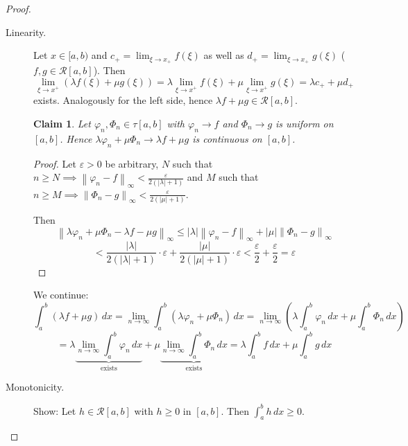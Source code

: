 \documentclass{article}
\newtheorem*{claim}{Claim}%
\newcommand{\norm}[1]{\left\|#1\right\|}
\newcommand{\card}[1]{\left|#1\right|}
\begin{document}
\begin{proof}\hfill{}
  \begin{description}
    \item[Linearity.] 
      Let $x \in [a,b)$ and $c_+ = \lim_{\xi \to x_+} f(\xi)$ as well as $d_+ = \lim_{\xi \to x_+} g(\xi)$
      ($f,g \in \mathcal R[a,b]$). Then
      \[
        \lim_{\xi \to x^+} (\lambda f(\xi) + \mu g(\xi))
          = \lambda \lim_{\xi \to x^+} f(\xi) + \mu \lim_{\xi \to x^+} g(\xi)
          = \lambda c_+ + \mu d_+
      \]
      exists. Analogously for the left side, hence $\lambda f + \mu g \in \mathcal R[a,b]$.

      \begin{claim}
        Let $\varphi_n, \Phi_n \in \tau[a,b]$ with $\varphi_n \to f$ and $\Phi_n \to g$ is uniform on $[a,b]$.
        Hence $\lambda \varphi_n + \mu \Phi_n \to \lambda f + \mu g$ is continuous on $[a,b]$.
      \end{claim}

      \begin{proof}
        Let $\varepsilon > 0$ be arbitrary,
        $N$ such that $n \geq N \implies \norm{\varphi_n - f}_{\infty} < \frac{\varepsilon}{2(\card{\lambda} + 1)}$
        and $M$ such that $n \geq M \implies \norm{\Phi_n - g}_{\infty} < \frac{\varepsilon}{2(\card{\mu} + 1)}$.

        Then
        \[
          \norm{\lambda \varphi_n + \mu \Phi_n - \lambda f - \mu g}_{\infty}
            \leq \card{\lambda} \norm{\varphi_n - f}_{\infty}
            + \card{\mu} \norm{\Phi_n - g}_{\infty}
        \] \[
            < \frac{\card{\lambda}}{2(\card{\lambda} + 1)} \cdot \varepsilon + \frac{\card{\mu}}{2(\card{\mu} + 1)} \cdot \varepsilon
            < \frac\varepsilon2 + \frac\varepsilon2 = \varepsilon
        \]
      \end{proof}

      We continue:
      \[
        \int_a^b (\lambda f + \mu g) \, dx = \lim_{n\to\infty} \int_a^b \left(\lambda \varphi_n + \mu \Phi_n\right) \, dx
          = \lim_{n\to\infty} \left(\lambda \int_a^b \varphi_n \, dx + \mu \int_a^b \Phi_n \, dx\right)
      \] \[
        = \lambda \underbrace{\lim_{n\to\infty} \int_a^b \varphi_n \, dx}_{\text{exists}}
        + \mu \underbrace{\lim_{n\to\infty} \int_a^b \Phi_n \, dx}_{\text{exists}}
        = \lambda \int_a^b f \, dx + \mu \int_a^b g \, dx
      \]
    \item[Monotonicity.]
      Show: Let $h \in \mathcal R[a,b]$ with $h \geq 0$ in $[a,b]$.
      Then $\int_a^b h \, dx \geq 0$.


\end{description}
\end{proof}
\end{document}
